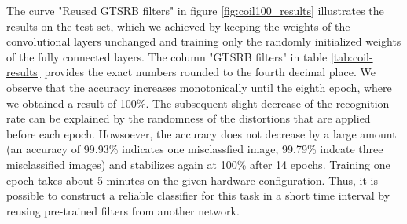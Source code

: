 \documentclass[11pt, a4paper]{article}
\begin{document}
The curve "Reused GTSRB filters" in figure \ref{fig:coil100_results} illustrates the results on the test set, which we achieved by keeping the weights of the convolutional layers unchanged and training only the randomly initialized weights of the fully connected layers. The column "GTSRB filters" in table \ref{tab:coil-results} provides the exact numbers rounded to the fourth decimal place. We observe that the accuracy increases monotonically until the eighth epoch, where we obtained a result of 100\%. The subsequent slight decrease of the recognition rate can be explained by the randomness of the distortions that are applied before each epoch. Howsoever, the accuracy does not decrease by a large amount (an accuracy of 99.93\% indicates one misclassfied image, 99.79\% indcate three misclassified images) and stabilizes again at 100\% after 14 epochs. Training one epoch takes about 5 minutes on the given hardware configuration. Thus, it is possible to construct a reliable classifier for this task in a short time interval by reusing pre-trained filters from another network.%
\end{document}
